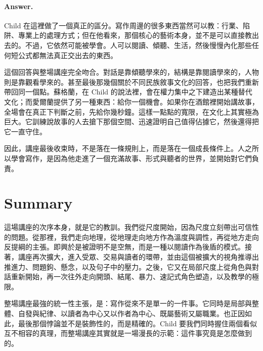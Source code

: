 \paragraph{Answer.} Child 在這裡做了一個真正的區分。寫作周邊的很多東西當然可以教：行業、陷阱、專業上的處理方式；但在他看來，那個核心的藝術本身，並不是可以直接教出去的。不過，它依然可能被學會。人可以閱讀、傾聽、生活，然後慢慢內化那些任何短公式都無法真正交出去的東西。

這個回答與整場講座完全吻合。對話是靠傾聽學來的，結構是靠閱讀學來的，人物則是靠觀看學來的。甚至最後那幾個關於不同民族敘事文化的回答，也把我們重新帶回同一個點。蘇格蘭，在 Child 的說法裡，會在權力集中之下建造出某種替代文化；而愛爾蘭提供了另一種東西：給你一個機會。如果你在酒館裡開始講故事，全場會在真正下判斷之前，先給你幾秒鐘。這樣一點點的寬限，在文化上其實極為巨大。它訓練說故事的人去搶下那個空間、迅速證明自己值得佔據它，然後還得把它一直守住。

因此，講座最後收束時，不是落在一條規則上，而是落在一個成長條件上。人之所以學會寫作，是因為他走進了一個充滿故事、形式與聽者的世界，並開始對它們負責。

\section{Summary}

這場講座的次序本身，就是它的教訓。我們從尺度開始，因為尺度立刻帶出可信性的問題。從那裡，我們走向地理，從地理走向地方作為溫度與調性，再從地方走向反提綱的主張。即興於是被證明不是空無，而是一種以閱讀作為後盾的模式。接著，講座再次擴大，進入受眾、交易與讀者的環帶，並由這個被擴大的視角推導出推進力、問題鉤、懸念，以及句子中的壓力。之後，它又在局部尺度上從角色與對話重新開始，再一次往外走向開頭、結尾、暴力、速記式角色塑造，以及教學的極限。

整場講座最強的統一性主張，是：寫作從來不是單一的一件事。它同時是局部與整體、自發與紀律、以讀者為中心又以作者為中心、既屬藝術又屬職業。也正因如此，最後那個悖論並不是裝飾性的，而是精確的。Child 要我們同時握住兩個看似互不相容的真理，而整場講座其實就是一場漫長的示範：這件事究竟是怎麼做到的。